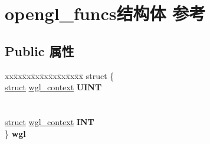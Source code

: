 \hypertarget{structopengl__funcs}{}\section{opengl\+\_\+funcs结构体 参考}
\label{structopengl__funcs}
\subsection*{Public 属性}
\begin{DoxyCompactItemize}
\item 
\mbox{\label{structopengl__funcs_a7955d1447108e229ca8733c339201f1b}} 
\begin{tabbing}
xx\=xx\=xx\=xx\=xx\=xx\=xx\=xx\=xx\=\kill
struct \{\\
\>\hyperlink{interfacestruct}{struct} \hyperlink{structwgl__context}{wgl\_context} {\bfseries UINT}\\
\\
\\
\>\hyperlink{interfacestruct}{struct} \hyperlink{structwgl__context}{wgl\_context} {\bfseries INT}\\
\} {\bfseries wgl}\\


\end{tabbing}
\end{DoxyCompactItemize}
